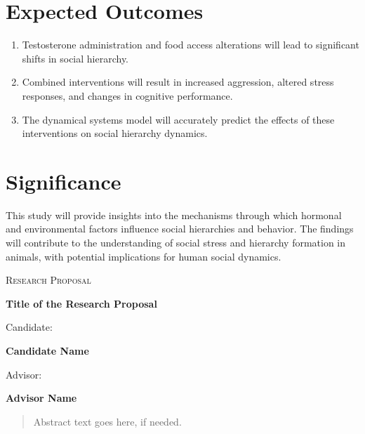 \documentclass[english, a4paper, 11pt]{article}
\begin{document}
\section*{Expected Outcomes}
\begin{enumerate}
    \item Testosterone administration and food access alterations will lead to significant shifts in social hierarchy.
    \item Combined interventions will result in increased aggression, altered stress responses, and changes in cognitive performance.
    \item The dynamical systems model will accurately predict the effects of these interventions on social hierarchy dynamics.
\end{enumerate}

\section*{Significance}
This study will provide insights into the mechanisms through which hormonal and environmental factors influence social hierarchies and behavior. The findings will contribute to the understanding of social stress and hierarchy formation in animals, with potential implications for human social dynamics.


\begin{center}

    \null\vfill

    {\scshape\large Research Proposal\par}

    \baselineskip

    {\LARGE\bfseries Title of the Research Proposal\par}

    \baselineskip

    Candidate:\\[1ex]
    {\large\bfseries Candidate Name\par}

    \baselineskip

    Advisor:\\[1ex]
    {\large\bfseries Advisor Name\par}

\end{center}

\vfill

\begin{abstract}
    Abstract text goes here, if needed.
\end{abstract}
\end{document}
